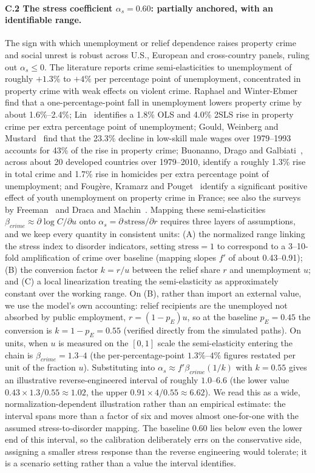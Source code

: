 \documentclass[12pt]{article}
\theoremstyle{plain}
\begin{document}
\paragraph{C.2 The stress coefficient $\alpha_s=0.60$: partially anchored, with an identifiable range.}
The sign with which unemployment or relief dependence raises property crime
and social unrest is robust across U.S., European and cross-country panels,
ruling out $\alpha_s\leq0$. The literature reports crime semi-elasticities to
unemployment of roughly $+1.3\%$ to $+4\%$ per percentage point of
unemployment, concentrated in property crime with weak effects on violent
crime. Raphael and Winter-Ebmer~\cite{RWE2001} find that a one-percentage-point
fall in unemployment lowers property crime by about 1.6\%--2.4\%;
Lin~\cite{Lin2008} identifies a 1.8\% OLS and 4.0\% 2SLS rise in property
crime per extra percentage point of unemployment; Gould, Weinberg and
Mustard~\cite{GWM2002} find that the 23.3\% decline in low-skill male wages
over 1979--1993 accounts for 43\% of the rise in property crime; Buonanno,
Drago and Galbiati~\cite{BDG2014}, across about 20 developed countries over
1979--2010, identify a roughly 1.3\% rise in total crime and 1.7\% rise in
homicides per extra percentage point of unemployment; and Foug\`ere, Kramarz
and Pouget~\cite{FKP2009} identify a significant positive effect of youth
unemployment on property crime in France; see also the surveys by
Freeman~\cite{Freeman1999} and Draca and Machin~\cite{DM2015}. Mapping these
semi-elasticities $\beta_{crime}\approx\partial\log C/\partial u$ onto
$\alpha_s=\partial\,\text{stress}/\partial r$ requires three layers of
assumptions, and we keep every quantity in consistent units: (A) the normalized
range linking the stress index to disorder indicators, setting
$\text{stress}=1$ to correspond to a 3--10-fold amplification of crime over
baseline (mapping slopes $f'$ of about 0.43--0.91); (B) the conversion factor
$k=r/u$ between the relief share $r$ and unemployment $u$; and (C) a local
linearization treating the semi-elasticity as approximately constant over the
working range. On (B), rather than import an external value, we use the model's
own accounting: relief recipients are the unemployed not absorbed by public
employment, $r=(1-p_E)u$, so at the baseline $p_E=0.45$ the conversion is
$k=1-p_E=0.55$ (verified directly from the simulated paths). On units, when
$u$ is measured on the $[0,1]$ scale the semi-elasticity entering the chain is
$\beta_{crime}=1.3$--$4$ (the per-percentage-point $1.3\%$--$4\%$ figures
restated per unit of the fraction $u$). Substituting into
$\alpha_s\approx f'\beta_{crime}(1/k)$ with $k=0.55$ gives an illustrative
reverse-engineered interval of roughly $1.0$--$6.6$ (the lower value
$0.43\times1.3/0.55\approx1.02$, the upper $0.91\times4/0.55\approx6.62$).
We read this as a wide, normalization-dependent illustration rather than an
empirical estimate: the interval spans more than a factor of six and moves
almost one-for-one with the assumed stress-to-disorder mapping. The baseline
$0.60$ lies below even the lower end of this interval, so the calibration
deliberately errs on the conservative side, assigning a smaller stress
response than the reverse engineering would tolerate; it is a scenario setting
rather than a value the interval identifies.
\end{document}
